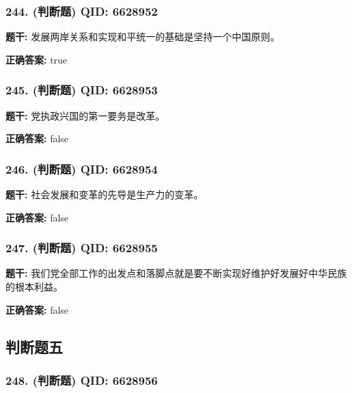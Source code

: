 \documentclass[12pt,UTF8]{ctexart}
\begin{document}
\subsubsection*{244. (判断题) \small QID: 6628952}

\textbf{题干:}
发展两岸关系和实现和平统一的基础是坚持一个中国原则。

\textbf{正确答案:}
true

\vspace{0.3em}\hrulefill\vspace{0.7em}

\subsubsection*{245. (判断题) \small QID: 6628953}

\textbf{题干:}
党执政兴国的第一要务是改革。

\textbf{正确答案:}
false

\vspace{0.3em}\hrulefill\vspace{0.7em}

\subsubsection*{246. (判断题) \small QID: 6628954}

\textbf{题干:}
社会发展和变革的先导是生产力的变革。

\textbf{正确答案:}
false

\vspace{0.3em}\hrulefill\vspace{0.7em}

\subsubsection*{247. (判断题) \small QID: 6628955}

\textbf{题干:}
我们党全部工作的出发点和落脚点就是要不断实现好维护好发展好中华民族的根本利益。

\textbf{正确答案:}
false

\vspace{0.3em}\hrulefill\vspace{0.7em}

\subsection*{判断题五}

\subsubsection*{248. (判断题) \small QID: 6628956}
\end{document}
